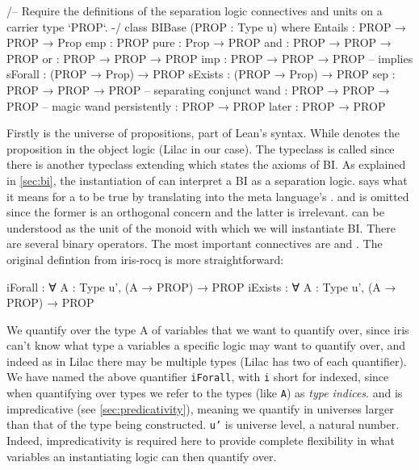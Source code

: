 \begin{leancode}
/--
Require the definitions of the separation logic connectives and units on a carrier type `PROP`.
-/
class BIBase (PROP : Type u) where
  Entails : PROP → PROP → Prop
  emp : PROP
  pure : Prop → PROP
  and : PROP → PROP → PROP
  or : PROP → PROP → PROP
  imp : PROP → PROP → PROP          -- implies
  sForall : (PROP → Prop) → PROP
  sExists : (PROP → Prop) → PROP
  sep : PROP → PROP → PROP          -- separating conjunct
  wand : PROP → PROP → PROP         -- magic wand
  persistently : PROP → PROP
  later : PROP → PROP
\end{leancode}

Firstly  is the universe of propositions, part of Lean's syntax. While  denotes the proposition in the object logic (Lilac in our case). The
typeclass is called  since there is another typeclass  extending  which states the axioms of BI. As
explained in \ref{sec:bi}, the instantiation of  can interpret a BI as a separation logic.  says what it means for a  to be true
by translating into the meta language's .  and  is omitted since the former
is an orthogonal concern and the latter is irrelevant.  can be understood as the unit of the monoid with which we will instantiate BI. There are several binary
operators. The most important connectives are   and . The original defintion from iris-rocq is more straightforward:

\begin{leancode}
  iForall : ∀ A : Type u', (A → PROP) → PROP
  iExists : ∀ A : Type u',  (A → PROP) → PROP
\end{leancode}

We quantify over the type A of variables that we want to quantify over, since iris can't know what type a variables a specific logic may want to quantify over, and indeed
as in Lilac there may be multiple types (Lilac has two of each quantifier). We have named the above quantifier \texttt{iForall}, with \texttt{i} short
for indexed, since when quantifying over types we refer to the types (like \texttt{A}) as \emph{type indices}.  and  is impredicative
(see \ref{sec:predicativity}), meaning we
quantify in universes larger than that of the type being constructed. \texttt{u'} is universe level, a natural number. Indeed, impredicativity is required here to provide complete flexibility in
what variables an instantiating logic can then quantify over.  

